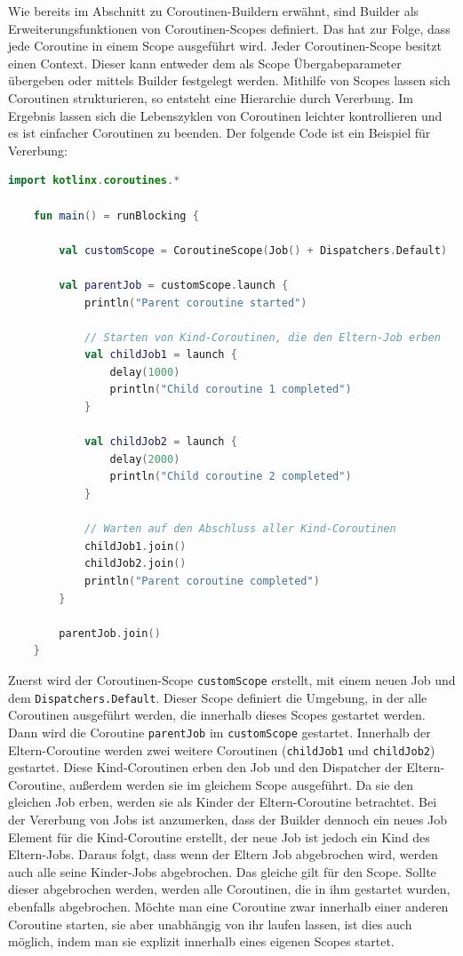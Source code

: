 \documentclass[fontsize=12pt,paper=a4,twoside=semi,parskip=half-,headsepline,headinclude]{scrreprt}
\begin{document}
Wie bereits im Abschnitt zu Coroutinen-Buildern erwähnt, sind Builder als  Erweiterungsfunktionen von Coroutinen-Scopes definiert. Das hat zur Folge, dass jede Coroutine in einem Scope ausgeführt wird. Jeder Coroutinen-Scope besitzt einen Context. Dieser kann entweder dem als Scope Übergabeparameter übergeben oder mittels Builder festgelegt werden. Mithilfe von Scopes lassen sich Coroutinen strukturieren, so entsteht eine Hierarchie durch Vererbung. Im Ergebnis lassen sich die Lebenszyklen von Coroutinen leichter kontrollieren und es ist einfacher Coroutinen zu beenden. Der folgende Code ist ein Beispiel für Vererbung:

\begin{lstlisting}[language=Kotlin]
	import kotlinx.coroutines.*

	fun main() = runBlocking {
	
    	val customScope = CoroutineScope(Job() + Dispatchers.Default)

		val parentJob = customScope.launch {
			println("Parent coroutine started")
			
			// Starten von Kind-Coroutinen, die den Eltern-Job erben
			val childJob1 = launch {
				delay(1000)
				println("Child coroutine 1 completed")
			}
		
			val childJob2 = launch {
				delay(2000)
				println("Child coroutine 2 completed")
			}
		
			// Warten auf den Abschluss aller Kind-Coroutinen
			childJob1.join()
			childJob2.join()
			println("Parent coroutine completed")
		}
	
		parentJob.join()
	}
\end{lstlisting}

Zuerst wird der Coroutinen-Scope \texttt{customScope} erstellt, mit einem neuen Job und dem \texttt{Dispatchers.Default}. Dieser Scope definiert die Umgebung, in der alle Coroutinen ausgeführt werden, die innerhalb dieses Scopes gestartet werden. Dann wird die Coroutine \texttt{parentJob} im \texttt{customScope} gestartet. Innerhalb der Eltern-Coroutine werden zwei weitere Coroutinen (\texttt{childJob1} und \texttt{childJob2}) gestartet. Diese Kind-Coroutinen erben den Job und den Dispatcher der Eltern-Coroutine, außerdem werden sie im gleichem Scope ausgeführt. Da sie den gleichen Job erben, werden sie als Kinder der Eltern-Coroutine betrachtet. Bei der Vererbung von Jobs ist anzumerken, dass der Builder dennoch ein neues Job Element für die Kind-Coroutine erstellt, der neue Job ist jedoch ein Kind des Eltern-Jobs. Daraus folgt, dass wenn der Eltern Job abgebrochen wird, werden auch alle seine Kinder-Jobs abgebrochen. Das gleiche gilt für den Scope.  Sollte dieser abgebrochen werden, werden alle Coroutinen, die in ihm gestartet wurden, ebenfalls abgebrochen. Möchte man eine Coroutine zwar innerhalb einer anderen Coroutine starten, sie aber unabhängig von ihr laufen lassen, ist dies auch möglich, indem man sie explizit innerhalb eines eigenen Scopes startet.
\end{document}
